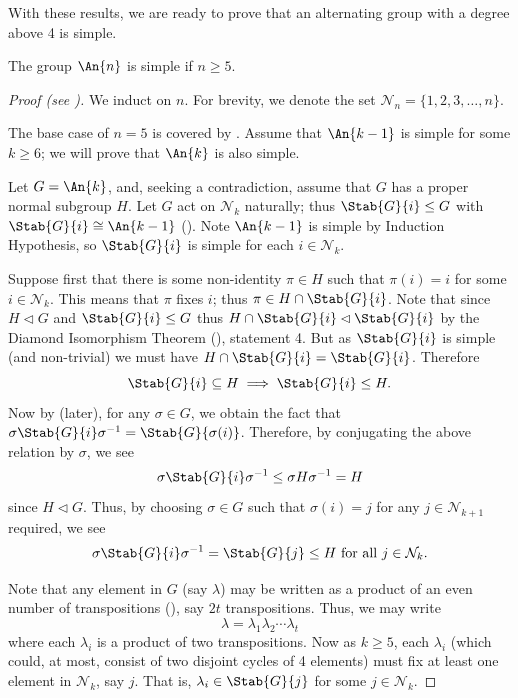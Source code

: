 With these results, we are ready to prove that an alternating group with a degree above 4 is simple.
\begin{theorem}\label{thrm-An-is-simple-for-n>=5}
    The group $\An{n}$ is simple if $n \geq 5$.
\end{theorem}
\begin{proof}[Proof (see {\cite[pp.~149--150, Theorem 24]{dummit_foote_2004}})]
    We induct on $n$. For brevity, we denote the set $\mathcal{N}_n = \{1, 2, 3, \dots, n\}$.
    
    The base case of $n = 5$ is covered by . Assume that $\An{k-1}$ is simple for some $k \geq 6$; we will prove that $\An{k}$ is also simple.

    Let $G = \An{k}$, and, seeking a contradiction, assume that $G$ has a proper normal subgroup $H$. Let $G$ act on $\mathcal{N}_{k}$ naturally; thus $\Stab{G}{i} \leq G$ with $\Stab{G}{i} \cong \An{k-1}$ (). Note $\An{k-1}$ is simple by Induction Hypothesis, so $\Stab{G}{i}$ is simple for each $i \in \mathcal{N}_{k}$.

    Suppose first that there is some non-identity $\pi \in H$ such that $\pi(i) = i$ for some $i \in \mathcal{N}_{k}$. This means that $\pi$ fixes $i$; thus $\pi \in H \cap \Stab{G}{i}$. Note that since $H \lhd G$ and $\Stab{G}{i} \leq G$ thus $H \cap \Stab{G}{i} \lhd \Stab{G}{i}$ by the Diamond Isomorphism Theorem (), statement 4. But as $\Stab{G}{i}$ is simple (and non-trivial) we must have $H \cap \Stab{G}{i} = \Stab{G}{i}$. Therefore
    \[
        \Stab{G}{i} \subseteq H \implies \Stab{G}{i} \leq H.
    \]
    Now by  (later), for any $\sigma \in G$, we obtain the fact that $\sigma\Stab{G}{i}\sigma^{-1} = \Stab{G}{\sigma(i)}$. Therefore, by conjugating the above relation by $\sigma$, we see
    \[
        \sigma\Stab{G}{i}\sigma^{-1} \leq \sigma H\sigma^{-1} = H
    \]
    since $H \lhd G$. Thus, by choosing $\sigma \in G$ such that $\sigma(i) = j$ for any $j \in \mathcal{N}_{k+1}$ required, we see
    \[
        \sigma\Stab{G}{i}\sigma^{-1} = \Stab{G}{j} \leq H \text{ for all } j \in \mathcal{N}_{k}.
    \]
    
    Note that any element in $G$ (say $\lambda$) may be written as a product of an even number of transpositions (), say $2t$ transpositions. Thus, we may write
    \[
        \lambda = \lambda_1\lambda_2\cdots\lambda_t
    \]
    where each $\lambda_i$ is a product of two transpositions. Now as $k \geq 5$, each $\lambda_i$ (which could, at most, consist of two disjoint cycles of 4 elements) must fix at least one element in $\mathcal{N}_{k}$, say $j$. That is, $\lambda_i \in \Stab{G}{j}$ for some $j \in \mathcal{N}_{k}$.
    

\end{proof}
